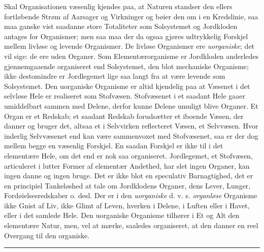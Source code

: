 \documentclass[12pt,a4paper]{book}
\newcommand{\streg}{\begin{center}\rule{2cm}{0.4pt}\end{center}}
\begin{document}
Skal Organisationen væsenlig kjendes paa, at Naturen standser den ellers
fortløbende Strøm af Aarsager og Virkninger og bøier den om i en Kredslinie,
saa maa ganske vist saadanne store Totaliteter som Solsystemet og Jordkloden
antages for Organismer; men saa maa der da ogsaa gjøres udtrykkelig Forskjel
mellem livløse og levende Organismer. De livløse Organismer ere
\emph{uorganiske}; det vil sige: de ere uden Organer. Som Elementærorganisme er
Jordkloden anderledes gjennemgaaende organiseret end Solsystemet, den blot
mechaniske Organisme; ikke destomindre er Jordlegemet lige saa langt fra at
være levende som Solsystemet. Den uorganiske Organisme er altid kjendelig paa
at Væsenet i det selvløse Hele er realiseret som Stofvæsen. Stofvæsenet i et
saadant Hele gaaer umiddelbart sammen med Delene, derfor kunne Delene umuligt
blive Organer. Et Organ er et Redskab; et saadant Redskab forudsætter et
iboende Væsen, der danner og bruger det, altsaa et i Selvvirken reflecteret
Væsen, et Selvvæsen. Hvor inderlig Selvvæsenet end kan være sammenvoxet med
Stofvæsenet, saa er der dog mellem begge en væsenlig Forskjel. En saadan
Forskjel er ikke til i det elementære Hele, om det end er nok saa organiseret.
Jordlegemet, et Stofvæsen, articuleret i lutter Former af elementær Andethed,
har slet ingen Organer, kan ingen danne og ingen bruge. Det er ikke blot en
speculativ Barnagtighed, det er en principiel Tankeløshed at tale om
Jordklodens Organer, dens Lever, Lunger, Fordøielsesredskaber o. desl. Der er i
den \emph{uorganiske}
d. v. s. \emph{organløse} Organisme ikke Gnist af Liv, ikke Glimt af Leven,
hverken i Delene, i Luften eller i Havet, eller i det samlede Hele. Den
uorganiske Organisme tilhører i Et og Alt den elementære Natur, men, vel at
mærke, saaledes organiseret, at den danner en reel Overgang til den organiske.

\streg
\end{document}
